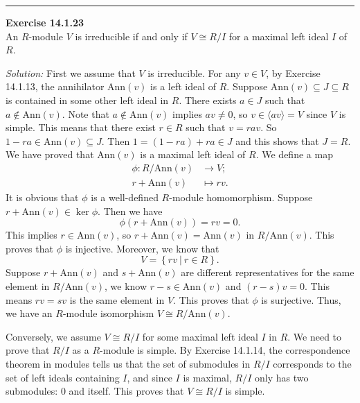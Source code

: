 \documentclass[a4paper, 12pt]{article}
\newenvironment{problem}[2][Exercise]
    { \begin{mdframed}[backgroundcolor=gray!20] \textbf{#1 #2} \\}
    {  \end{mdframed}}
\newenvironment{solution}
    {\textit{Solution:}}
    {}
\newcommand{\la}{\langle}
\newcommand{\ra}{\rangle}
\newcommand{\Ann}{\text{Ann}}
\begin{document}
\noindent\rule{7in}{2.8pt}
\begin{problem}{14.1.23}
An \(R\)-module \(V\) is irreducible if and only if \(V\cong R/I\) for a maximal left ideal \(I\) of \(R\).
\end{problem}
\begin{solution}
First we assume that \(V\) is irreducible. For any \(v\in V\), by Exercise 14.1.13, the annihilator \(\Ann(v)\) is a left ideal of \(R\). Suppose \(\Ann(v)\subseteq J\subseteq R\) is contained in some other left ideal in \(R\). There exists \(a\in J\) such that \(a\notin \Ann(v)\). Note that 
\(a\notin \Ann(v)\) implies \(av\neq 0\), so \(v\in \la av\ra =V\) since \(V\) is simple. This means that there exist \(r\in R\) such that \(v=rav\). So \(1-ra\in \Ann(v)\subseteq J\). Then \(1=(1-ra)+ra\in J\) and this shows that \(J=R\). We have proved that \(\Ann(v)\) is a maximal left ideal of 
\(R\). We define a map 
\begin{align*}
    \phi:R/\Ann(v)&\rightarrow V;\\ 
       r+\Ann(v)&\mapsto rv.
\end{align*}
It is obvious that \(\phi\) is a well-defined \(R\)-module homomorphism. Suppose \(r+\Ann(v)\in \ker \phi\). Then we have 
\[\phi(r+\Ann(v))=rv=0.\]
This implies \(r\in \Ann(v)\), so \(r+\Ann(v)=\Ann(v)\) in \(R/\Ann(v)\). This proves that \(\phi\) is injective. Moreover, we know that 
\[V=\left\{ rv\ |\ r\in R \right\}.\]
Suppose \(r+\Ann(v)\) and \(s+\Ann(v)\) are different representatives for the same element in \(R/\Ann(v)\), we know \(r-s\in \Ann(v)\) and \((r-s)v=0\). This means \(rv=sv\) is the same element in \(V\). This proves that 
\(\phi\) is surjective. Thus, we have an \(R\)-module isomorphism \(V\cong R/\Ann(v)\). 

Conversely, we assume \(V\cong R/I\) for some maximal left ideal \(I\) in \(R\). We need to prove that \(R/I\) as a \(R\)-module is simple. By Exercise 14.1.14, the correspondence theorem in modules tells us that the set of submodules in \(R/I\) corresponds to the set of left ideals containing \(I\), and 
since \(I\) is maximal, \(R/I\) only has two submodules: \(0\) and itself. This proves that \(V\cong R/I\) is simple.
\end{solution}
\end{document}

